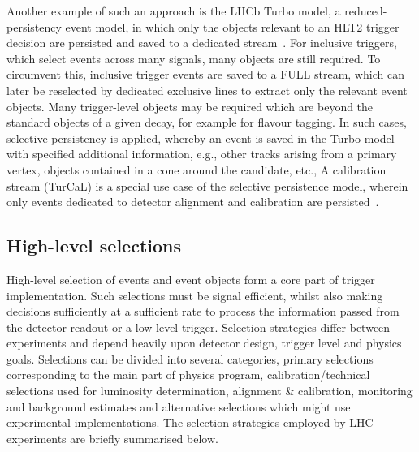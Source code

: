 Another example of such an approach is the LHCb Turbo model, a reduced-persistency event model, in which only the objects relevant to an HLT2 trigger decision are persisted and saved to a dedicated stream~\cite{Aaij:2016rxn}. For inclusive triggers, which select events across many signals, many objects are still required. To circumvent this, inclusive trigger events are saved to a FULL stream, which can later be reselected by dedicated exclusive lines to extract only the relevant event objects. Many trigger-level objects may be required which are beyond the standard objects of a given decay, for example for flavour tagging. In such cases, selective persistency is applied, whereby an event is saved in the Turbo model with specified additional information, e.g., other tracks arising from a primary vertex, objects contained in a cone around the candidate, etc., A calibration stream (TurCaL) is a special use case of the selective persistence model, wherein only events dedicated to detector alignment and calibration are persisted~\cite{Aaij:2019uij}. %



\subsection{High-level selections}

High-level selection of events and event objects form a core part of trigger implementation. Such selections must be signal efficient, whilst also making decisions sufficiently at a sufficient rate to process the information passed from the detector readout or a low-level trigger. Selection strategies differ between experiments and depend heavily upon detector design, trigger level and physics goals. Selections can be divided into several categories, primary selections corresponding to the main part of physics program, calibration/technical selections used for luminosity determination, alignment \& calibration, monitoring and background estimates and alternative selections which might use experimental implementations. The selection strategies employed by LHC experiments are briefly summarised below.

